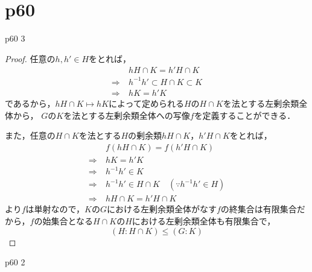 \documentclass[dvipdfmx,uplatex,11pt]{jsarticle}
\theoremstyle{mytheorem}
\begin{document}
\section{p60}
p60 3
\begin{leftbar}
    \begin{proof}
        任意の$h,h' \in H$をとれば，
        \begin{align*}
            & h H \cap K = h' H \cap K \\
            \Longrightarrow ~& h^{-1} h ' \subset H \cap K \subset K \\
            \Longrightarrow ~& hK = h' K
        \end{align*}
        であるから，$h H \cap K \longmapsto hK$によって定められる$H$の$H \cap K$を法とする左剰余類全体から，
        $G$の$K$を法とする左剰余類全体への写像$f$を定義することができる．

        また，任意の$H \cap K$を法とする$H$の剰余類$h H \cap K$，$h' H \cap K$をとれば，
        \begin{align*}
            & f (h H \cap K) =f(h' H \cap K) \\
            \Longrightarrow ~& hK = h'K \\
            \Longrightarrow ~& h^{-1} h' \in K \\
            \Longrightarrow ~& h^{-1} h ' \in  H \cap K \quad (\because h^{-1}h' \in H) \\
            \Longrightarrow ~& h H \cap K = h' H \cap K
        \end{align*}
        より$f$は単射なので，$K$の$G$における左剰余類全体がなす$f$の終集合は有限集合だから，$f$の始集合となる$H \cap K$の$H$における左剰余類全体も有限集合で，
        \[
            (H : H \cap K) \le (G :K)
        \]
    \end{proof}
    \end{leftbar}
    \newpage
    p60 2
\end{document}

